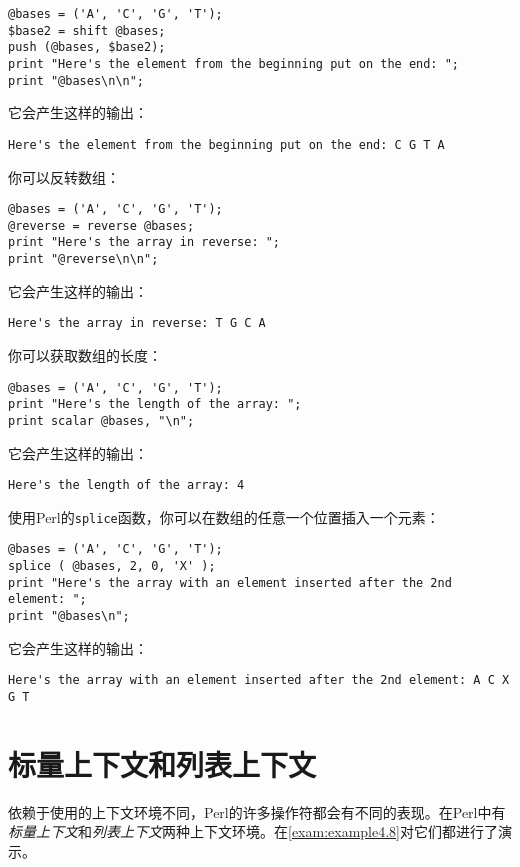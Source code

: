 \begin{lstlisting}
@bases = ('A', 'C', 'G', 'T');
$base2 = shift @bases;
push (@bases, $base2);
print "Here's the element from the beginning put on the end: ";
print "@bases\n\n";
\end{lstlisting}

它会产生这样的输出：

\begin{lstlisting}
Here's the element from the beginning put on the end: C G T A
\end{lstlisting}

你可以反转数组：

\begin{lstlisting}
@bases = ('A', 'C', 'G', 'T');
@reverse = reverse @bases;
print "Here's the array in reverse: ";
print "@reverse\n\n";
\end{lstlisting}

它会产生这样的输出：

\begin{lstlisting}
Here's the array in reverse: T G C A
\end{lstlisting}

你可以获取数组的长度：

\begin{lstlisting}
@bases = ('A', 'C', 'G', 'T');
print "Here's the length of the array: ";
print scalar @bases, "\n";
\end{lstlisting}

它会产生这样的输出：

\begin{lstlisting}
Here's the length of the array: 4
\end{lstlisting}

使用Perl的\verb|splice|函数，你可以在数组的任意一个位置插入一个元素：

\begin{lstlisting}
@bases = ('A', 'C', 'G', 'T');
splice ( @bases, 2, 0, 'X' );
print "Here's the array with an element inserted after the 2nd element: ";
print "@bases\n";
\end{lstlisting}

它会产生这样的输出：

\begin{lstlisting}
Here's the array with an element inserted after the 2nd element: A C X G T
\end{lstlisting}

\section{标量上下文和列表上下文}
依赖于使用的上下文环境不同，Perl的许多操作符都会有不同的表现。在Perl中有\textit{标量上下文}和\textit{列表上下文}两种上下文环境。在\autoref{exam:example4.8}对它们都进行了演示。

